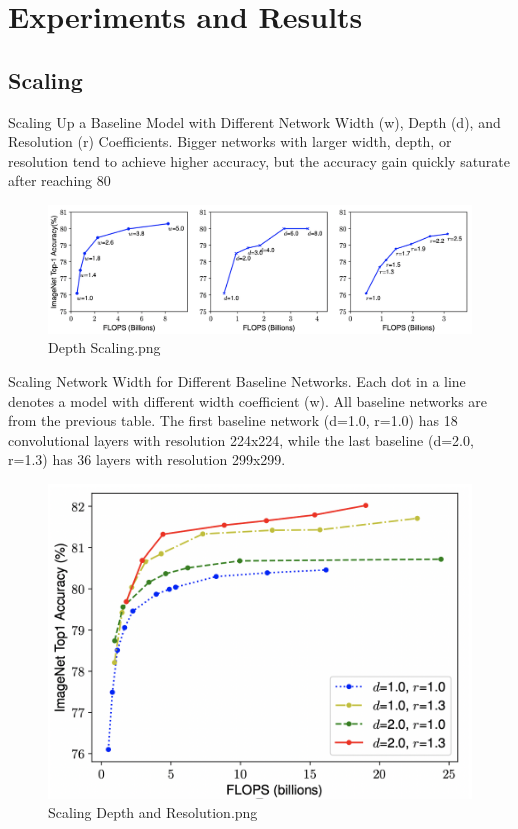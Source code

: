 \chapter{Experiments and Results}
\section{Scaling}

Scaling Up a Baseline Model with Different Network Width (w), Depth (d), and Resolution (r) Coefficients. Bigger networks with larger width, depth, or resolution tend to achieve higher accuracy, but the accuracy gain quickly saturate after reaching 80%

\begin{figure}[htpb]
\centering
\includegraphics[width=\textwidth,height=\textheight,keepaspectratio]{../../static/Depth Scaling.png}
\caption{Depth Scaling.png}
\end{figure}Scaling Network Width for Different Baseline Networks. Each dot in a line denotes a model with different width coefficient (w). All baseline networks are from the previous table. The first baseline network (d=1.0, r=1.0) has 18 convolutional layers with resolution 224x224, while the last baseline (d=2.0, r=1.3) has 36 layers with resolution 299x299.

\begin{figure}[htpb]
\centering
\includegraphics[width=\textwidth,height=\textheight,keepaspectratio]{../../static/Scaling Depth and Resolution.png}
\caption{Scaling Depth and Resolution.png}
\end{figure}
